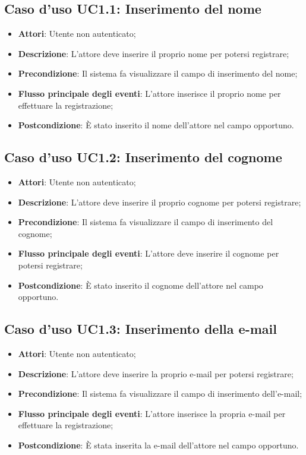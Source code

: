 \subsection{Caso d'uso \texorpdfstring{UC1.1}{UC1.1}: Inserimento del nome}
\begin{itemize}
	\item \textbf{Attori}: Utente non autenticato;
	\item \textbf{Descrizione}: L'attore deve inserire il proprio nome per potersi registrare;
	\item \textbf{Precondizione}: Il sistema fa visualizzare il campo di inserimento del nome;
	\item \textbf{Flusso principale degli eventi}: L'attore inserisce il proprio nome per effettuare la registrazione;
	\item \textbf{Postcondizione}: È stato inserito il nome dell'attore nel campo opportuno.
\end{itemize}
\subsection{Caso d'uso \texorpdfstring{UC1.2}{UC1.2}: Inserimento del cognome}
\begin{itemize}
	\item \textbf{Attori}: Utente non autenticato;
	\item \textbf{Descrizione}: L'attore deve inserire il proprio cognome per potersi registrare;
	\item \textbf{Precondizione}: Il sistema fa visualizzare il campo di inserimento del cognome;
	\item \textbf{Flusso principale degli eventi}: L'attore deve inserire il cognome per potersi registrare;
	\item \textbf{Postcondizione}: È stato inserito il cognome dell'attore nel campo opportuno.
\end{itemize}
\subsection{Caso d'uso \texorpdfstring{UC1.3}{UC1.3}: Inserimento della e-mail}
\begin{itemize}
	\item \textbf{Attori}: Utente non autenticato;
	\item \textbf{Descrizione}: L'attore deve inserire la proprio e-mail per potersi registrare;
	\item \textbf{Precondizione}: Il sistema fa visualizzare il campo di inserimento dell'e-mail;
	\item \textbf{Flusso principale degli eventi}: L'attore inserisce la propria e-mail per effettuare la registrazione;
	\item \textbf{Postcondizione}: È stata inserita la e-mail dell'attore nel campo opportuno.
\end{itemize}
